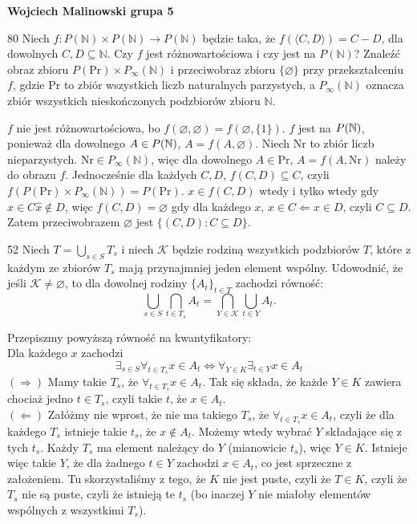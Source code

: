 \documentclass{../note}
\begin{document}
\textbf{Wojciech Malinowski grupa 5}
\begin{zadanie}{80}
Niech $f:P(\mathbb{N})\times P(\mathbb{N})\rightarrow P(\mathbb{N})$ będzie taka, że $f(\langle C,D\rangle)=C-D$, dla dowolnych $C,D\subseteq\mathbb{N}.$
    Czy $f$ jest różnowartościowa i czy jest na $P(\mathbb{N})$? Znaleźć obraz zbioru $P(\text{Pr})\times P_{\infty}(\mathbb{N})$ i przeciwobraz zbioru $\{\varnothing\}$ przy przekształceniu $f$, gdzie Pr to zbiór wszystkich liczb naturalnych parzystych, a $P_{\infty}(\mathbb{N})$ oznacza zbiór wszystkich nieskończonych podzbiorów zbioru $\mathbb{N}$.
\end{zadanie}
\begin{rozwiazanie}
$f$ nie jest różnowartościowa, bo $f(\varnothing, \varnothing) = f(\varnothing, \{1\})$. $f$ jest na $P(\mathbb{N})$, ponieważ dla dowolnego $A \in P(\mathbb{N})$, $A = f(A, \varnothing)$. Niech Nr to zbiór liczb nieparzystych. $\text{Nr} \in P_{\infty}(\mathbb{N})$, więc dla dowolnego $A \in \text{Pr}$, $A = f(A, \text{Nr})$ należy do obrazu $f$. Jednocześnie dla każdych $C, D$, $f(C, D) \subseteq C$, czyli $f(P(\text{Pr})\times P_{\infty}(\mathbb{N})) = P(\text{Pr})$. $x \in f(C, D)$ wtedy i tylko wtedy gdy $x \in C \hat x \notin D$, więc $f(C, D) = \varnothing$ gdy dla każdego $x$, $x \in C \Leftarrow x \in D$, czyli $C \subseteq D$. Zatem przeciwobrazem $\varnothing$ jest $\{(C, D): C \subseteq D\}$.
\end{rozwiazanie}

\begin{zadanie}{52}
Niech $T=\bigcup_{s\in S}T_{s}$ i niech $\mathcal{K}$ będzie rodziną wszystkich podzbiorów $T$, które z każdym ze zbiorów $T_{s}$ mają przynajmniej jeden element wspólny. Udowodnić, że jeśli $\mathcal{K}\ne\varnothing$, to dla dowolnej rodziny $\{A_{t}\}_{t\in T}$ zachodzi równość:
    \[
        \bigcup_{s\in S}\bigcap_{t\in T_{s}}A_{t}=\bigcap_{Y\in \mathcal{K}}\bigcup_{t\in Y}A_{t}.
    \]
\end{zadanie}
\begin{rozwiazanie}
Przepiszmy powyższą równość na kwantyfikatory:\\
Dla każdego $x$ zachodzi
\[\exists_{s \in S} \forall_{t \in T_s} x \in A_t \Leftrightarrow \forall_{Y\in K} \exists_{t \in Y} x \in A_t\]
$(\Rightarrow)$ Mamy takie $T_s$, że $\forall_{t \in T_s} x \in A_t$. Tak się składa, że każde $Y \in K$ zawiera chociaż jedno $t \in T_s$, czyli takie $t$, że $x \in A_t$.\\
$(\Leftarrow)$ Załóżmy nie wprost, że nie ma takiego $T_s$, że $\forall_{t \in T_s} x \in A_t$, czyli że dla każdego $T_s$ istnieje takie $t_s$, że $x \notin A_t$. Możemy wtedy wybrać $Y$ składające się z tych $t_s$. Każdy $T_s$ ma element należący do $Y$ (mianowicie $t_s$), więc $Y \in K$. Istnieje więc takie $Y$, że dla żadnego $t \in Y$ zachodzi $x \in A_t$, co jest sprzeczne z założeniem. Tu skorzystaliśmy z tego, że $K$ nie jest puste, czyli że $T \in K$, czyli że $T_s$ nie są puste, czyli że istnieją te $t_s$ (bo inaczej $Y$ nie miałoby elementów wspólnych z wszystkimi $T_s$).
\end{rozwiazanie}
\end{document}
